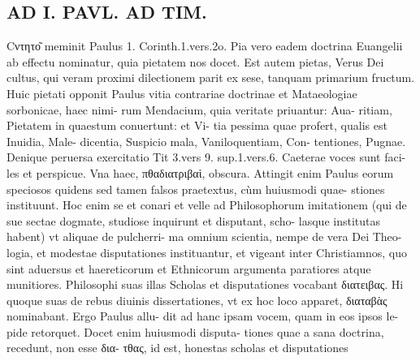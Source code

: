 \documentclass{article}
\begin{document}
\begin{pages}
\section*{AD I. PAVL. AD TIM. }
\marginpar{[ p.420 ]}\pstart Cντητο͂ meminit Paulus 1. Corinth.1.vers.2o.  \pend\pstart Pia vero eadem doctrina Euangelii ab effectu nominatur, quia pietatem nos docet. Est autem pietas, Verus Dei cultus, qui veram proximi dilectionem parit ex sese, tanquam primarium fructum.  \pend\pstart Huic pietati opponit Paulus vitia contrariae doctrinae et Mataeologiae sorbonicae, haec nimi- rum Mendacium, quia veritate priuantur: Aua- ritiam, Pietatem in quaestum conuertunt: et Vi- tia pessima quae profert, qualis est Inuidia, Male- dicentia, Suspicio mala, Vaniloquentiam, Con- tentiones, Pugnae. Denique peruersa exercitatio Tit 3.vers 9. sup.1.vers.6. Caeterae voces sunt faci- les et perspicue. Vna haec, πθαδιατριβαὶ, obscura. Attingit enim Paulus eorum speciosos quidens sed tamen falsos praetextus, cùm huiusmodi quae- stiones instituunt. Hoc enim se et conari et velle ad Philosophorum imitationem (qui de sue sectae dogmate, studiose inquirunt et disputant, scho- lasque institutas habent) vt aliquae de pulcherri- ma omnium scientia, nempe de vera Dei Theo- logia, et modestae disputationes instituantur, et vigeant inter Christiamnos, quo sint aduersus et haereticorum et Ethnicorum argumenta paratiores atque  munitiores. Philosophi suas illas Scholas et disputationes vocabant διατειβας. Hi quoque  suas de rebus diuinis dissertationes, vt ex hoc loco apparet, διαταβὰς nominabant. Ergo Paulus allu- dit ad hanc ipsam vocem, quam in eos ipsos le- pide retorquet. Docet enim huiusmodi disputa- tiones quae a sana doctrina, recedunt, non esse δια- τθας, id est, honestas scholas et disputationes  \pend

\end{pages}
\end{document}
